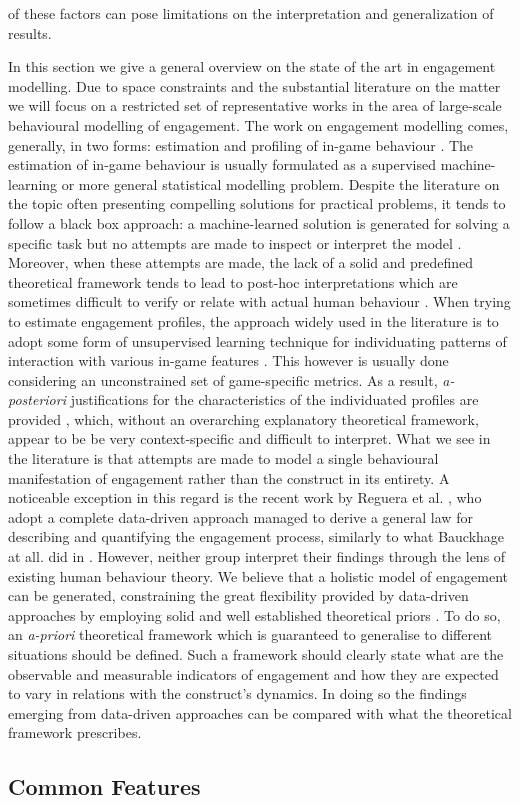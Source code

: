 of these factors can pose limitations on the interpretation and generalization of results. 


In this section we give a general overview on the state of the art in engagement modelling. Due to space constraints and the substantial literature on the matter we will focus on a restricted set of representative works in the area of large-scale behavioural modelling of engagement. The work on engagement modelling comes, generally, in two forms: estimation and profiling of in-game behaviour \cite{el2016game}. The estimation of in-game behaviour is usually formulated as a supervised machine-learning or more general statistical modelling problem\cite{el2016game}. Despite the literature on the topic often presenting compelling solutions for practical problems, it tends to follow a black box approach: a machine-learned solution is generated for solving a specific task but no attempts are made to inspect or interpret the model \cite{lee2018game, liu2019micro, del2020time, kristensen2019combining}. Moreover, when these attempts are made, the lack of a solid and predefined theoretical framework tends to lead to post-hoc interpretations which are sometimes difficult to verify or relate with actual human behaviour \cite{drachen2016rapid, del2019profiling}. When trying to estimate engagement profiles, the approach widely used in the literature is to adopt some form of unsupervised learning technique for individuating patterns of interaction with various in-game features \cite{el2016game, del2019profiling}. This however is usually done considering an unconstrained set of game-specific metrics. As a result, \textit{a-posteriori} justifications for the characteristics of the individuated profiles are provided \cite{drachen2012guns, makarovych2018like, drachen2009player}, which, without an overarching explanatory theoretical framework, appear to be be very context-specific and difficult to interpret. What we see in the literature is that attempts are made to model a single behavioural manifestation of engagement rather than the construct in its entirety. A noticeable exception in this regard is the recent work by Reguera et al. \cite{reguera2020quantifying}, who adopt a complete data-driven approach managed to derive a general law for describing and quantifying the engagement process, similarly to what Bauckhage at all. did in \cite{bauckhage2012players}. However, neither group interpret their findings through the lens of existing human behaviour theory. We believe that a holistic model of engagement can be generated, constraining the great flexibility provided by data-driven approaches by employing solid and well established theoretical priors \cite{yannakakis2013player}. To do so, an \textit{a-priori} theoretical framework which is guaranteed to generalise to different situations should be defined. Such a framework should clearly state what are the observable and measurable indicators of engagement and how they are expected to vary in relations with the construct's dynamics. In doing so the findings emerging from data-driven approaches can be compared with what the theoretical framework prescribes.
\subsection{Common Features}
\label{estimation_prediction}
\lorem

\lorem



